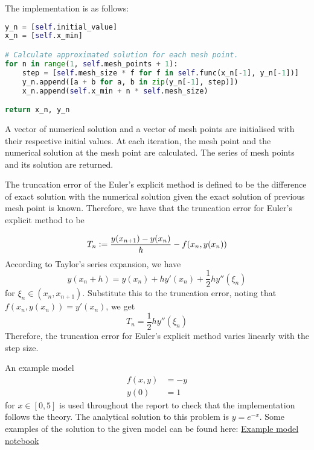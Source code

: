 The implementation is as follows:
\begin{lstlisting}[language=Python, caption= {Euler's explicit method}, title={Euler's explicit method}, label=Euler_explicit_code]
y_n = [self.initial_value]
x_n = [self.x_min]

# Calculate approximated solution for each mesh point.
for n in range(1, self.mesh_points + 1):
    step = [self.mesh_size * f for f in self.func(x_n[-1], y_n[-1])]
    y_n.append([a + b for a, b in zip(y_n[-1], step)])
    x_n.append(self.x_min + n * self.mesh_size)

return x_n, y_n
\end{lstlisting}

A vector of numerical solution and a vector of mesh points are initialised with their respective initial values. At each iteration, the mesh point and the numerical solution at the mesh point are calculated. The series of mesh points and its solution are returned.

The truncation error of the Euler's explicit method is defined to be the difference of exact solution with the numerical solution given the exact solution of previous mesh point is known. Therefore, we have that the truncation error for Euler's explicit method to be

\begin{equation}
\label{eqn:trun_err_def}
    T_n \vcentcolon= \frac{y(x_{n+1}) - y(x_{n})}{h} - f(x_n, y(x_n))
\end{equation}
According to Taylor's series expansion, we have 
\begin{equation}
    y(x_n + h) = y(x_n) + hy'(x_n) + \frac{1}{2}hy''(\xi_n)
\end{equation}
for $\xi_n \in (x_n, x_{n+1})$. Substitute this to the truncation error, noting that $f(x_n, y(x_n)) = y'(x_n)$, we get
\begin{equation}
    T_n = \frac{1}{2}hy''(\xi_n)
\end{equation}
Therefore, the truncation error for Euler's explicit method varies linearly with the step size.

An example model 
\begin{align}
\label{eqn:example_model}
    f(x,y) &= -y \\
    y(0) &= 1
\end{align}
for $x \in [0, 5]$ is used throughout the report to check that the implementation follows the theory. The analytical solution to this problem is $y = e^{-x}$. Some examples of the solution to the given model can be found here: \href{https://nbviewer.jupyter.org/github/FarmHJ/numerical-solver/blob/main/examples/solver_convergence.ipynb}{Example model notebook}


